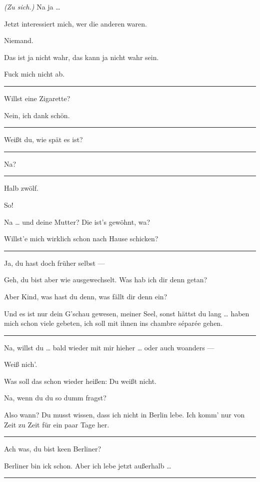 \documentclass[
	final,
	a4paper,
	ngerman,
	mpinclude = true, %
	twoside = true,
	open = right,
	cleardoublepage = plain,
	DIV = 13,
	BCOR = 1cm,
	titlepage = firstiscover,
	]{scrbook}
\newcommand{\direction}[1]{\textit{(#1)}}
\newenvironment{deletion}{%
		\vspace{0.25\baselineskip}
		\hrule
		\vspace{0.25\baselineskip}
		\color{darkgray}
	}{
		\color{black}
		\vspace{0.25\baselineskip}
		\hrule 
		\vspace{0.25\baselineskip}
	}
\newcommand{\thecharacter}[1]{\textup{\textsc{#1}}\xspace}
\newcommand{\thegatte}{\thecharacter{Christian}}
\newcommand{\thesuesse}{\thecharacter{Lola}}
\newcommand{\character}[1]{\item[#1:]}
\newcommand{\gatte}{\character{\thegatte}}
\newcommand{\suesse}{\character{\thesuesse}}
\begin{document}
\begin{play}
	\suesse
	\direction{Zu sich.} Na ja \ldots{}

	\gatte
	Jetzt interessiert mich, wer die anderen waren.

	\suesse
	Niemand.

	\gatte
	Das ist ja nicht wahr, das kann ja nicht wahr sein.

	\suesse
	Fuck mich nicht ab.

	\begin{deletion}
	\gatte
	Willst eine Zigarette?

	\suesse
	Nein, ich dank schön.
	\end{deletion}

	\gatte
	Weißt du, wie spät es ist?
	\begin{deletion}
	\suesse
	Na?

	\gatte
	\end{deletion}
	Halb zwölf.

	\suesse
	So!

	\gatte
	Na \ldots{} und deine Mutter? Die ist's gewöhnt, wa?

	\suesse
	Willst'e mich wirklich schon nach Hause schicken?

	\begin{deletion}
	\gatte
	Ja, du hast doch früher selbst ---

	\suesse
	Geh, du bist aber wie ausgewechselt. Was hab ich dir denn getan?

	\gatte
	Aber Kind, was hast du denn, was fällt dir denn ein?

	\suesse
	Und es ist nur dein G'schau gewesen, meiner Seel, sonst hättst du lang \ldots{} haben mich schon viele gebeten, ich soll mit ihnen ins chambre séparée gehen.
	\end{deletion}

	\gatte
	Na, willst du \ldots{} bald wieder mit mir hieher \ldots{} oder auch woanders ---

	\suesse
	Weiß nich'.

	\gatte
	Was soll das schon wieder heißen: Du weißt nicht.

	\suesse
	Na, wenn du du so dumm fragst?

	\gatte
	Also wann? Du musst wissen, dass ich nicht in Berlin lebe. Ich komm' nur von Zeit zu Zeit für ein paar Tage her.

	\begin{deletion}
	\suesse
	Ach was, du bist keen Berliner?

	\gatte
	Berliner bin ick schon. Aber ich lebe jetzt außerhalb \ldots{}
	\end{deletion}


\end{play}
\end{document}
